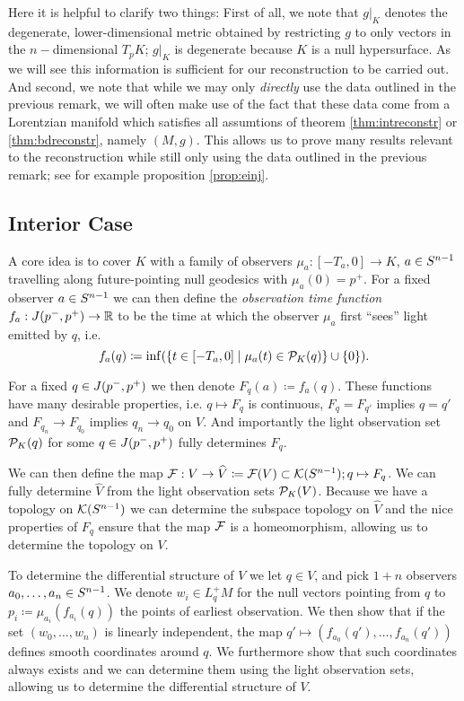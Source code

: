 Here it is helpful to clarify two things: First of all, we note that $g\rvert_K$ denotes the degenerate, lower-dimensional metric obtained by restricting $g$ to only vectors in the $n-$dimensional $T_pK$; $g\rvert_K$ is degenerate because $K$ is a null hypersurface. As we will see this information is sufficient for our reconstruction to be carried out.
And second, we note that while we may only \emph{directly} use the data outlined in the previous remark, we will often make use of the fact that these data come from a Lorentzian manifold which satisfies all assumtions of theorem \ref{thm:intreconstr} or \ref{thm:bdreconstr}, namely $(M,g)$. This allows us to prove many results relevant to the reconstruction while still only using the data outlined in the previous remark; see for example proposition \ref{prop:einj}.

\subsection{Interior Case}
A core idea is to cover $K$ with a family of observers $\mu_a:[-T_a,0]\to K$, $a\in {S^{n-1}}$ travelling along future-pointing null geodesics with $\mu_a(0)=p^+$. For a fixed observer $a\in {S^{n-1}}$ we can then define the \emph{observation time function} $f_a:J(p^-,p^+)\to \mathbb{R}$ to be the time at which the observer $\mu_a$ first \enquote{sees} light emitted by $q$, i.e. 
\[
    f_a(q)\coloneqq \inf (\{t\in [-T_a,0] \mid \mu_a(t)\in {\mathcal{P}}_K(q)\}\cup \{0\}).
\]

For a fixed $q\in J(p^-,p^+)$ we then denote $F_q(a)\coloneqq f_a(q)$. These functions have many desirable properties, i.e. $q\mapsto F_q$ is continuous, $F_q=F_{q'}$ implies $q=q'$ and $F_{q_n}\to F_{q_0}$ implies $q_n\to q_0$ on $V$.
And importantly the light observation set ${\mathcal{P}}_K(q)$ for some $q\in J(p^-,p^+)$ fully determines $F_q$. 

We can then define the map $\mathcal{F}:V\to \widehat{V}\coloneqq \mathcal{F}(V)\subset {\mathcal{K}}({S^{n-1}}); q\mapsto F_q$. We can fully determine $\widehat{V}$ from the light observation sets ${\mathcal{P}}_K(V)$. Because we have a topology on ${\mathcal{K}}({S^{n-1}})$ we can determine the subspace topology on $\widehat{V}$ and the nice properties of $F_q$ ensure that the map $\mathcal{F}$ is a homeomorphism, allowing us to determine the topology on $V$.

To determine the differential structure of $V$ we let $q\in V$, and pick $1+n$ observers $a_0,\dots,a_n\in {S^{n-1}}$. We denote $w_i\in L^+_qM$ for the null vectors pointing from $q$ to $p_i\coloneqq \mu_{a_i}(f_{a_i}(q))$ the points of earliest observation. We then show that if the set $(w_0,\dots, w_n)$ is linearly independent, the map $q'\mapsto (f_{a_0}(q'),\dots, f_{a_n}(q'))$ defines smooth coordinates around $q$. We furthermore show that such coordinates always exists and we can determine them using the light observation sets, allowing us to determine the differential structure of $V$.

